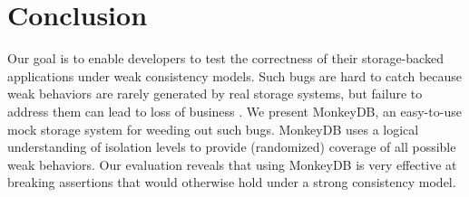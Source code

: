 
\section{Conclusion}
\label{sec:app:conc}

Our goal is to enable developers to test the correctness of their storage-backed applications under 
weak consistency models. Such bugs are hard to catch because weak behaviors are
rarely generated by real storage systems, but failure to address them can lead
to loss of business \cite{DBLP:conf/sigmod/WarszawskiB17}. We present MonkeyDB, an easy-to-use mock storage system
for weeding out such bugs. MonkeyDB uses a logical understanding of isolation
levels to provide (randomized) coverage of all possible weak behaviors. Our evaluation reveals that
using MonkeyDB is very effective at breaking assertions that would otherwise
hold under a strong consistency model.

